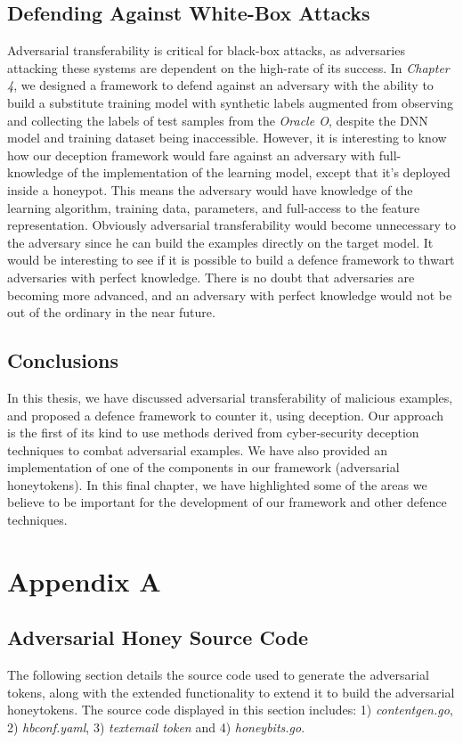 \documentclass[grad,lot,lof,11pt,oneside,onehalfspace]{RUthesis}
\begin{document}
\section{Defending Against White-Box Attacks}
Adversarial transferability is critical for black-box attacks, as adversaries attacking these systems are dependent on the high-rate of its success. In \textit{Chapter 4}, we designed a framework to defend against an adversary with the ability to build a substitute training model  with synthetic labels augmented from observing and collecting the labels of test samples from the \textit{Oracle O}, despite the DNN model and training dataset being inaccessible. However, it is interesting to know how our deception framework would fare against an adversary with full-knowledge of the implementation of the learning model, except that it's deployed inside a honeypot. This means the adversary would have knowledge of the learning algorithm, training data, parameters, and full-access to the feature representation. Obviously adversarial transferability would become unnecessary to the adversary since he can build the examples directly on the target model. It would be interesting to see if it is possible to build a defence framework to thwart  adversaries with perfect knowledge. There is no doubt that adversaries are becoming more advanced, and an adversary with perfect knowledge would not be out of the ordinary in the near future.  
\section{Conclusions}
In this thesis, we have discussed adversarial transferability  of malicious examples, and proposed a defence framework to counter it, using deception. Our approach is the first of its kind to use methods derived from cyber-security deception techniques to combat adversarial examples. We have also provided an implementation of one of the components in our framework (adversarial honeytokens). In this final chapter, we have highlighted some of the areas we believe to be important for the development of our framework and other defence techniques. 
\chapter{Appendix A}
\section{Adversarial Honey Source Code}
The following section details the source code used to generate the adversarial tokens, along with the extended functionality to extend it to build the adversarial honeytokens. The source code displayed in this section includes: 1) \textit{contentgen.go}, 2) \textit{hbconf.yaml}, 3) \textit{textemail token} and 4) \textit{honeybits.go}.
\end{document}
